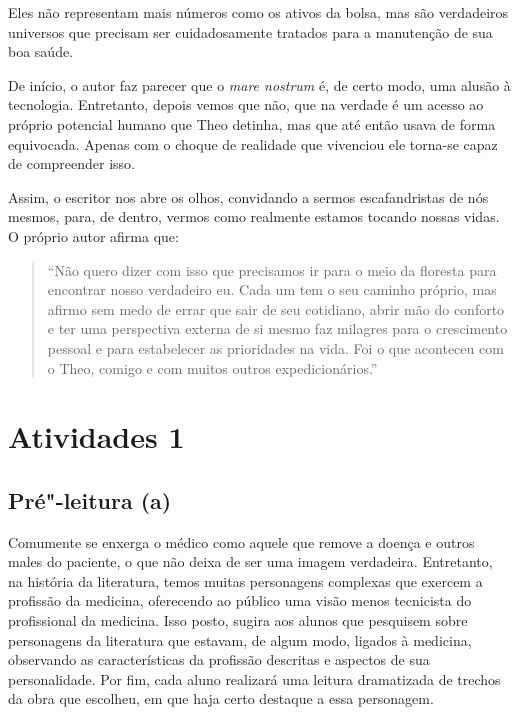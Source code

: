 \documentclass[12pt]{extarticle}
\begin{document}
Eles não representam mais números como os ativos da bolsa, mas são verdadeiros
universos que precisam ser cuidadosamente tratados para a manutenção de sua boa
saúde.
 
De início, o autor faz parecer que o \emph{mare nostrum} é, de certo modo, uma alusão
à tecnologia. Entretanto, depois vemos que não, que na verdade é um acesso ao próprio
potencial humano que Theo detinha, mas que até então usava de forma
equivocada. Apenas com o choque de realidade que vivenciou ele torna-se capaz de compreender
isso.

Assim, o escritor nos abre os olhos, convidando a sermos escafandristas de
nós mesmos, para, de dentro, vermos como realmente estamos tocando nossas
vidas. O próprio autor afirma que: 

\begin{quote}
“Não quero dizer com isso que precisamos ir para
o meio da floresta  para encontrar nosso verdadeiro eu. 
Cada um tem o seu caminho próprio, mas afirmo sem medo de errar que sair de
seu cotidiano, abrir mão do conforto e ter uma perspectiva externa de si mesmo
faz milagres para o crescimento pessoal e para estabelecer as prioridades na
vida. Foi o que aconteceu com o Theo, comigo e com muitos outros expedicionários.”
\end{quote}

\section{Atividades 1}


\subsection{Pré"-leitura (a)}

  


Comumente se enxerga o médico como aquele que remove a doença e outros males do
paciente, o que não deixa de ser uma imagem verdadeira. Entretanto, na história da literatura,
temos muitas personagens complexas que exercem a profissão da medicina,
oferecendo ao público uma visão menos tecnicista do profissional da medicina.
Isso posto, sugira aos alunos que pesquisem sobre personagens da literatura que
estavam, de algum modo, ligados à medicina, observando as características da
profissão descritas e aspectos de sua personalidade. Por fim, cada aluno
realizará uma leitura dramatizada de trechos da obra que escolheu, em que haja
certo destaque a essa personagem. 
\end{document}
